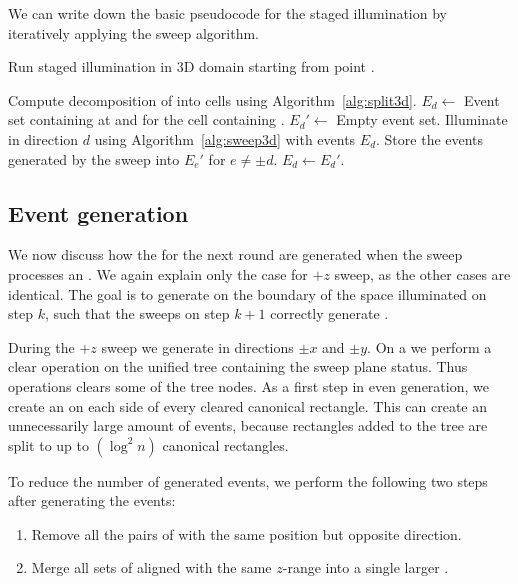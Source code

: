 \documentclass[english,gradu]{tktltiki2018}
\begin{document}
We can write down the basic pseudocode for the staged illumination by iteratively applying the sweep algorithm.

\begin{alg}\label{alg:minlink3d}
Run staged illumination in 3D domain \fspace starting from point \spt.
\begin{algorithmic}
\State Compute decomposition of \fspace into cells using Algorithm~\ref{alg:split3d}.
	\State $E_d\gets$ Event set containing \addE at \spt and \cellE for the cell containing \spt.
\EndFor
{}
		\State $E_d'\gets$ Empty event set.
	\EndFor
		\State Illuminate in direction $d$ using Algorithm~\ref{alg:sweep3d} with events $E_d$.
		\State Store the events generated by the sweep into $E_e'$ for $e\neq\pm d$.
	\EndFor
		\State $E_d\gets E_d'$.
	\EndFor
\EndWhile
\end{algorithmic}
\end{alg}

\subsection{Event generation}\label{sec:evtgen}

We now discuss how the \addEs for the next round are generated when the sweep processes an \obsE.
We again explain only the case for $+z$ sweep, as the other cases are identical.
The goal is to generate \addEs on the boundary of the space illuminated on step $k$, such that the sweeps on step $k+1$ correctly generate .

During the $+z$ sweep we generate \addEs in directions $\pm x$ and $\pm y$.
On a \obsE we perform a clear operation on the unified tree containing the sweep plane status.
Thus operations clears some of the tree nodes.
As a first step in even generation, we create an \addEs on each side of every cleared canonical rectangle.
This can create an unnecessarily large amount of events, because rectangles added to the tree are split to up to $(\log^2 n)$ canonical rectangles.

To reduce the number of generated events, we perform the following two steps after generating the events:
\begin{enumerate}
\item Remove all the pairs of \addEs with the same position but opposite direction.
\item Merge all sets of aligned \addEs with the same $z$-range into a single larger \addE.
\end{enumerate}
\end{document}
